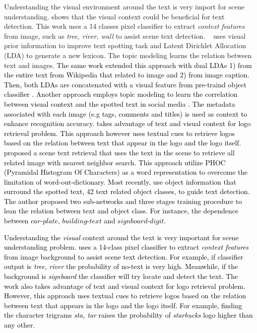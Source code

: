 \documentclass[phd,tocprelim]{cornell}
\begin{document}
Understanding the visual environment around the text is very import for scene understanding. \cite{zhu2016could} shows that the visual context could be beneficial for text detection. This work uses a 14 classes pixel classifier to extract \textit{context features} from image, such as \textit{tree, river, wall} to assist scene text detection. ~\cite{patel2016dynamic} uses visual prior information to improve text spotting task and Latent Dirichlet Allocation (LDA) \cite{blei2003latent} to generate a new lexicon. The topic modeling learns the relation between text and images. \textcolor{black}{The same work extended this approach with dual LDAs 1) from the entire text from Wikipedia that related to image and 2) from image caption. Then, both LDAs are concatenated with a visual feature from pre-traind object classifier \cite{patel2019self}. Another approach employs topic modeling to learn the correlation between visual context and the spotted text in social media \cite{kang2017detection}. The metadata associated with each image (e.g tags, comments and titles) is used as context to enhance recognition accuracy. \cite{karaoglu2017text} takes advantage of text and visual context for logo retrieval problem. This approach  however uses textual cues to retrieve logos based on the relation between text that appear in the logo and the logo itself. \cite{GomezMaflaECCV2018single} proposed  a scene text retrieval that uses the text in the scene to retrieve all related image with nearest neighbor search. This approach utilize PHOC (Pyramidal Histogram Of Characters) as a word representation to overcome the limitation of word-out-dictionary. Most recently, \cite{prasad_2018_ECCV} use object information that surround the spotted text, 42 text related object classes, to guide text detection. The author proposed two sub-networks and three stages training procedure to lean the relation between text and object class. For instance, the dependence between $car$-$plate$, $building$-$text$ and $sign board$-$digit$.}


 \textcolor{black}{Understanding the  \textit{visual} context around the text is very important for scene understanding problem.   \cite{zhu2016could} uses a 14-class pixel classifier to extract \textit{context features} from image background to assist scene text detection. 
 For example, if classifier output is \textit{tree, river} the probability of no-text is very high. Meanwhile, if the background is \textit{signboard} the classifier will try locate and detect the text. 
 The work \cite{karaoglu2017text} also takes advantage of text and visual context for logo retrieval problem. However, this approach uses textual cues to retrieve logos based on the relation between text that appears in the logo and the logo itself. 
 For example, finding the character trigrams \textit{sta, tar} raises the probability of \textit{starbucks} logo higher than any other.
 } 
 
\end{document}
